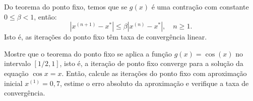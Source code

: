 \begin{obs}
  Do teorema do ponto fixo, temos que se $g(x)$ é uma contração com constante $0\leq \beta < 1$, então:
  \begin{equation*}
    |x^{(n+1)}-x^*| \leq \beta |x^{(n)}-x^*|,\quad n\geq 1.
  \end{equation*}
Isto é, as iterações do ponto fixo têm taxa de convergência linear.
\end{obs}

\begin{ex}\label{ex:ponto_fixo_3}
Mostre que o teorema do ponto fixo se aplica a função $g(x) = \cos(x)$ no intervalo $[1/2, 1]$, isto é, a iteração de ponto fixo converge para a solução da equação $\cos x = x$. Então, calcule as iterações do ponto fixo com aproximação inicial $x^{(1)} = 0,7$, estime o erro absoluto da aproximação e verifique a taxa de convergência.
\end{ex}
